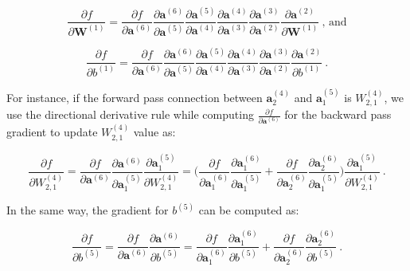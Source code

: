 \begin{equation}
\label{eq:compute_dl/dW}
\frac{\partial f}{\partial \textbf{W}^{(1)}} = \frac{\partial f}{\partial \textbf{a}^{(6)}}  \frac{\partial \textbf{a}^{(6)}}{\partial \textbf{a}^{(5)}}  \frac{\partial \textbf{a}^{(5)}}{\partial \textbf{a}^{(4)}}  \frac{\partial \textbf{a}^{(4)}}{\partial \textbf{a}^{(3)}}  \frac{\partial \textbf{a}^{(3)}}{\partial \textbf{a}^{(2)}}  \frac{\partial \textbf{a}^{(2)}}{\partial \textbf{W}
^{(1)}}\:\text{, and}
\end{equation} 



\begin{equation}
\label{eq:compute_dl/db}
\frac{\partial f}{\partial b^{(1)}} = \frac{\partial f}{\partial \textbf{a}^{(6)}}  \frac{\partial \textbf{a}^{(6)}}{\partial \textbf{a}^{(5)}}  \frac{\partial \textbf{a}^{(5)}}{\partial \textbf{a}^{(4)}}  \frac{\partial \textbf{a}^{(4)}}{\partial \textbf{a}^{(3)}}  \frac{\partial \textbf{a}^{(3)}}{\partial \textbf{a}^{(2)}}  \frac{\partial \textbf{a}^{(2)}}{\partial b^{(1)}}\:\text{.}
\end{equation} 



For instance, if the forward pass connection between $\textbf{a}_{2}^{(4)}$ and $\textbf{a}_{1}^{(5)}$ is $W^{(4)}_{2,1}$, we use the directional derivative rule while computing $\frac{\partial f}{\partial \textbf{a}^{(6)}}$ for the backward pass gradient to update $W^{(4)}_{2,1}$ value as: 


\begin{equation}
\label{eq:compute_specific_weight}
\frac{\partial f}{\partial W^{(4)}_{2,1}} = \frac{\partial f}{\partial \textbf{a}^{(6)}} \frac{\partial \textbf{a}^{(6)}}{\partial \textbf{a}_{1}^{(5)}}  \frac{\partial \textbf{a}_{1}^{(5)}}{\partial W^{(4)}_{2,1}} = \Big ( \frac{\partial f}{\partial \textbf{a}_{1}^{(6)}}  \frac{\partial \textbf{a}_{1}^{(6)}}{\partial \textbf{a}_{1}^{(5)}} + \frac{\partial f}{\partial \textbf{a}_{2}^{(6)}} \frac{\partial \textbf{a}_{2}^{(6)}}{\partial \textbf{a}_{1}^{(5)}} \Big )  \frac{\partial \textbf{a}_{1}^{(5)}}{\partial W^{(4)}_{2,1}} \:\text{.}
\end{equation} 


In the same way, the gradient for $b^{(5)}$ can be computed as: 


\begin{equation}
\label{eq:compute_specific_bias}
\frac{\partial f}{\partial b^{(5)}} = \frac{\partial f}{\partial \textbf{a}^{(6)}}  \frac{\partial \textbf{a}^{(6)}}{\partial b^{(5)}} = \frac{\partial f}{\partial \textbf{a}_{1}^{(6)}}  \frac{\partial \textbf{a}_{1}^{(6)}}{\partial b^{(5)}} + \frac{\partial f}{\partial \textbf{a}_{2}^{(6)}}  \frac{\partial \textbf{a}_{2}^{(6)}}{\partial b^{(5)}}\:\text{.}
\end{equation} 



